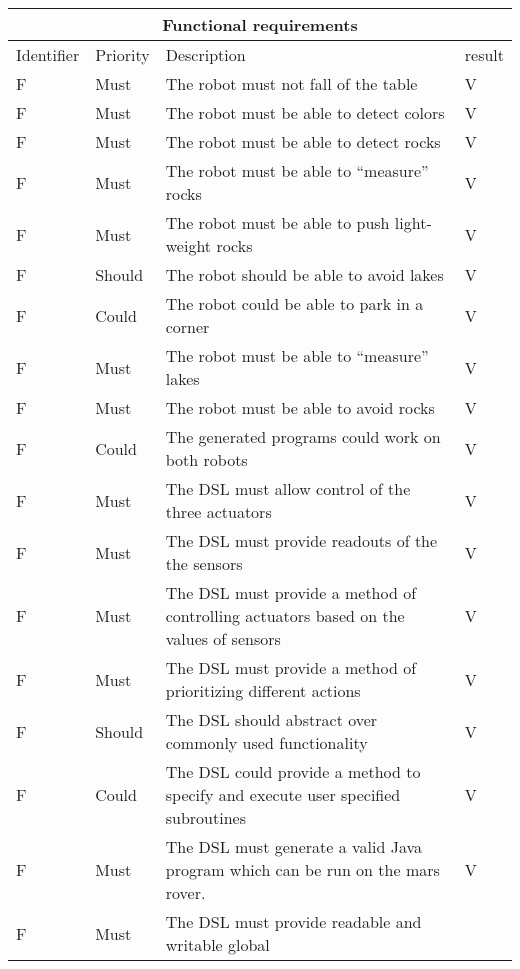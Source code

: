 \setcounter{TCC}{1}
\begin{table}[H]
	\centering
	\begin{tabular}{|l|l|l|l|}
		\hline
		\multicolumn{4}{|c|}{Functional requirements} \\  \hline
		\hline
		Identifier & Priority & Description & result \\  
		\hline
		\hline
		F\doTCC  & Must & The robot must not fall of the table & V \\  \hline
		F\doTCC  & Must & The robot must be able to detect colors & V \\  \hline
		F\doTCC  & Must & The robot must be able to detect rocks & V \\  \hline
		F\doTCC  & Must & The robot must be able to ``measure'' rocks & V \\  \hline
		F\doTCC  & Must & The robot must be able to push light-weight rocks 
			& V \\  \hline
		F\doTCC  & Should & The robot should be able to avoid lakes & V \\  \hline
		F\doTCC  & Could & The robot could be able to park in a corner 
			& V \\  \hline
		F\doTCC & Must & The robot must be able to ``measure'' lakes & V \\  \hline
		F\doTCC & Must & The robot must be able to avoid rocks & V \\  \hline
		F\doTCC & Could & The generated programs could work on both robots
			& V\\  \hline
		F\doTCC & Must & The DSL must allow control of the three actuators & V
			\\  \hline
		F\doTCC & Must & The DSL must provide readouts of the the sensors & V
			\\  \hline
		F\doTCC & Must & The DSL must provide a method of controlling actuators
			based on the values of sensors & V \\  \hline
		F\doTCC & Must & The DSL must provide a method of prioritizing different
			actions & V \\  \hline
		F\doTCC & Should & The DSL should abstract over commonly used 
			functionality & V\\  \hline
		F\doTCC & Could & The DSL could provide a method to specify and execute
			user specified subroutines & V\\  \hline
		F\doTCC & Must & The DSL must generate a valid Java program which can be
			run on the mars rover. & V\\  \hline
		F\doTCC & Must & The DSL must provide readable and writable global

\end{tabular}
\end{table}
